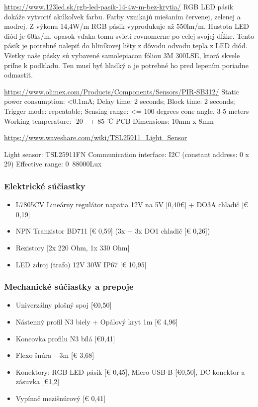 \documentclass[12pt, a4paper]{article}
\begin{document}
\url{https://www.123led.sk/rgb-led-pasik-14-4w-m-bez-krytia/}
RGB LED pásik dokáže vytvoriť akúkoľvek farbu. Farby vznikajú miešaním červenej, zelenej a modrej.
Z výkonu 14,4W/m RGB pásik vyprodukuje až 550lm/m. Hustota LED diód je 60ks/m, opasok vďaka tomu svieti rovnomerne po celej svojej dĺžke. Tento pásik je potrebné nalepiť do hliníkovej lišty z dôvodu odvodu tepla z LED diód. Všetky naše pásky sú vybavené samolepiacou fóliou 3M 300LSE, ktorá skvele priľne k podkladu. Ten musí byť hladký a je potrebné ho pred lepením poriadne odmastiť.

\url{https://www.olimex.com/Products/Components/Sensors/PIR-SB312/}
    Static power consumption: <0.1mA; 
    Delay time: 2 seconds; 
    Block time: 2 seconds; 
    Trigger mode: repeatable; 
    Sensing range: <= 100 degrees cone angle, 3-5 meters
    Working temperature: -20 - + 85 ℃ 
    PCB Dimensions: 10mm x 8mm
    
  \url{https://www.waveshare.com/wiki/TSL25911_Light_Sensor}
  
  Light sensor: TSL25911FN
Communication interface: I2C (constant address: 0 x 29)
Effective range: 0~88000Lux


\subsubsection{Elektrické súčiastky}
\begin{itemize}
\item L7805CV Lineárny regulátor napätia 12V na 5V [0,40€] + DO3A chladič [€ 0,19]
\item NPN Tranzistor BD711 [€ 0,59] (3x + 3x DO1 chladič [€ 0,26])
\item Rezistory [2x 220 Ohm, 1x 330 Ohm]
\item LED zdroj (trafo) 12V 30W IP67 [€ 10,95]
\end{itemize}

\subsubsection{Mechanické súčiastky a prepoje}

\begin{itemize}
\item Univerzálny plošný spoj [€0,50]
\item Nástenný profil N3 biely + Opálový kryt 1m [€ 4,96]
\item Koncovka profilu N3 bílá [€0,41]
\item Flexo šnúra – 3m [€ 3,68]
\item Konektory: RGB LED pásik [€ 0,45], Micro USB-B [€0,50], DC konektor a zásuvka [€1,2]
\item Vypínač mezišnúrový [€ 0,41]
\end{itemize}
\newpage
\end{document}

